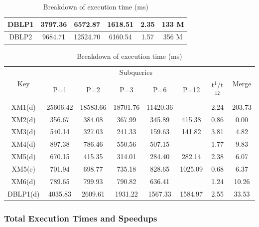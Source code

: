 \begin{table}[t]
\begin{tabular}{c|c|c|c|c|c}
		DBLP1                & 3797.36                   & 6572.87             & 1618.51            & 2.35           & 133 M                   \\ \hline
    DBLP2                & 9684.71                   & 12524.70            & 6160.54            & 1.57           & 356 M                   \\ \hline
	\end{tabular}
    \vspace{10px}
	\centering
\caption{Breakdown of execution time (ms)}
\label{tab:qpsbreakdown}
\begin{tabular}{c|c|c|c|c|c|c|c}
	\hline
	\multirow{2}{*}{Key} & \multicolumn{6}{c|}{Subqueries}                              & \multirow{2}{*}{Merge} \\ \cline{2-7}
	& P=1      & P=2      & P=3      & P=6      & P=12    & t$^1$/t$^{12}$ &                        \\ \hline
	XM1(d)               & 25606.42 & 18583.66 & 18701.76 & 11420.36 &         & 2.24   & 203.73                 \\ \hline
	XM2(d)               & 356.67   & 384.08   & 367.99   & 345.89   & 415.38  & 0.86   & 0.00                   \\ \hline
	XM3(d)               & 540.14   & 327.03   & 241.33   & 159.63   & 141.82  & 3.81   & 4.82                   \\ \hline
	XM4(d)               & 897.38   & 786.46   & 550.56   & 507.15   &         & 1.77   & 9.83                   \\ \hline
	XM5(d)               & 670.15   & 415.35   & 314.01   & 284.40   & 282.14  & 2.38   & 6.07                   \\ \hline
	XM5(e)               & 701.94   & 698.77   & 735.18   & 828.65   & 1025.09 & 0.68   & 6.37                   \\ \hline
	XM6(d)               & 789.65   & 799.93   & 790.82   & 636.41   &         & 1.24   & 10.26                  \\ \hline
	DBLP1(d)             & 4035.83  & 2609.61  & 1931.22  & 1567.33  & 1584.97 & 2.55   & 33.53                  \\ \hline
\end{tabular}
\end{table}


\subsubsection{Total Execution Times and Speedups}

